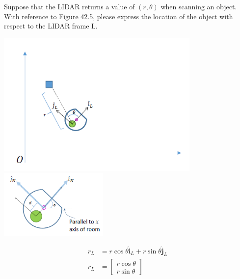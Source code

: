 Suppose that the LIDAR returns a value of $(r, \theta)$ when scanning an object. With reference to Figure 42.5, please express the location of the object with respect to the LIDAR frame L.

\begin{center}
    \includegraphics[width=0.75\textwidth]{img/42-5.png}
    \includegraphics[width=0.4\textwidth]{img/42-6.png}
\end{center}

\begin{solution}
\begin{align*}
    r_L &= r\cos\theta \boldsymbol{\hat{i}}_L + r\sin\theta \boldsymbol{\hat{j}}_L \\
    r_L &= \begin{bmatrix}
        r\cos\theta \\
        r\sin\theta
    \end{bmatrix}
\end{align*}
\end{solution}